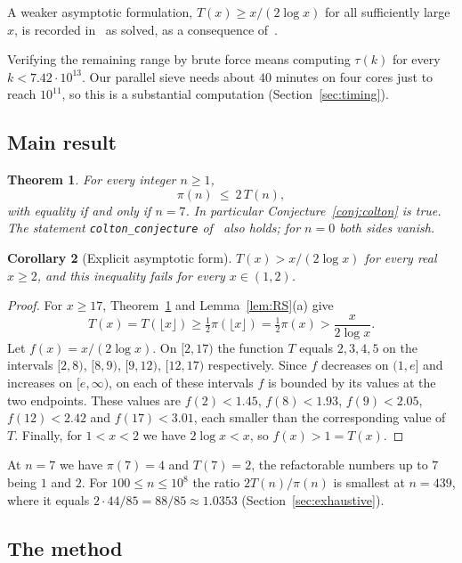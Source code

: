 \documentclass[11pt,a4paper]{article}
\newtheorem{theorem}{Theorem}[section]
\newtheorem{corollary}[theorem]{Corollary}
\theoremstyle{definition}
\begin{document}
A weaker asymptotic formulation, $T(x)\ge x/(2\log x)$ for all sufficiently large $x$, is recorded in~\cite{FC} as solved, as a consequence of~\cite{Ze02,Sp85}.

Verifying the remaining range by brute force means computing $\tau(k)$ for every $k<7.42\cdot10^{13}$. Our parallel sieve needs about $40$ minutes on four cores just to reach $10^{11}$, so this is a substantial computation (Section~\ref{sec:timing}).

\subsection{Main result}

\begin{theorem}\label{thm:main}
For every integer $n\ge1$,
\[
\pi(n)\ \le\ 2\,T(n),
\]
with equality if and only if $n=7$. In particular Conjecture~\ref{conj:colton} is true. The statement \texttt{colton\_conjecture} of~\cite{FC} also holds; for $n=0$ both sides vanish.
\end{theorem}

\begin{corollary}[Explicit asymptotic form]\label{cor:explicit}
$T(x)>x/(2\log x)$ for every real $x\ge2$, and this inequality fails for every $x\in(1,2)$.
\end{corollary}

\begin{proof}
For $x\ge17$, Theorem~\ref{thm:main} and Lemma~\ref{lem:RS}(a) give
\[
T(x)=T(\lfloor x\rfloor)\ge\tfrac12\pi(\lfloor x\rfloor)=\tfrac12\pi(x)>\frac{x}{2\log x}.
\]
Let $f(x)=x/(2\log x)$. On $[2,17)$ the function $T$ equals $2,3,4,5$ on the intervals $[2,8)$, $[8,9)$, $[9,12)$, $[12,17)$ respectively. Since $f$ decreases on $(1,e]$ and increases on $[e,\infty)$, on each of these intervals $f$ is bounded by its values at the two endpoints. These values are $f(2)<1.45$, $f(8)<1.93$, $f(9)<2.05$, $f(12)<2.42$ and $f(17)<3.01$, each smaller than the corresponding value of $T$. Finally, for $1<x<2$ we have $2\log x<x$, so $f(x)>1=T(x)$.
\end{proof}

At $n=7$ we have $\pi(7)=4$ and $T(7)=2$, the refactorable numbers up to $7$ being $1$ and $2$. For $100\le n\le10^{8}$ the ratio $2T(n)/\pi(n)$ is smallest at $n=439$, where it equals $2\cdot44/85=88/85\approx1.0353$ (Section~\ref{sec:exhaustive}).

\subsection{The method}
\end{document}
